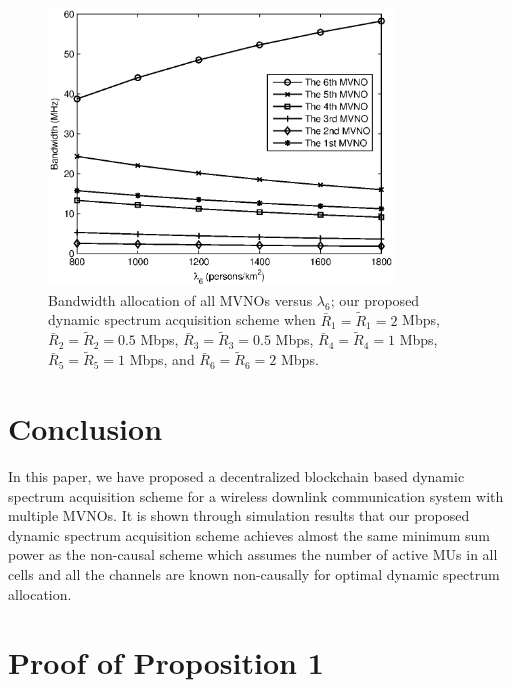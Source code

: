 \documentclass[journal]{IEEEtran}
\begin{document}
\begin{figure}
\centering
\includegraphics[width=3.6in]{fig5.eps}
\caption{Bandwidth allocation of all MVNOs versus $\lambda_6$; our proposed dynamic spectrum acquisition scheme when $\bar{R}_1 =\tilde{R}_1=2$ Mbps, $\bar{R}_2 =\tilde{R}_2=0.5$ Mbps, $\bar{R}_3=\tilde{R}_3=0.5$ Mbps, $\bar{R}_4 =\tilde{R}_4=1$ Mbps, $\bar{R}_5=\tilde{R}_5=1$ Mbps, and $\bar{R}_6 =\tilde{R}_6=2$ Mbps.}
\end{figure}

\section{Conclusion}
In this paper, we have proposed a decentralized blockchain based dynamic spectrum acquisition scheme for a wireless downlink communication system with multiple MVNOs. It is shown through simulation results that our proposed dynamic spectrum acquisition scheme achieves almost the same minimum sum power as the non-causal scheme which assumes the number of active MUs in all cells and all the channels are known non-causally for optimal dynamic spectrum allocation.

\appendices
\section{Proof of Proposition 1}
\end{document}
